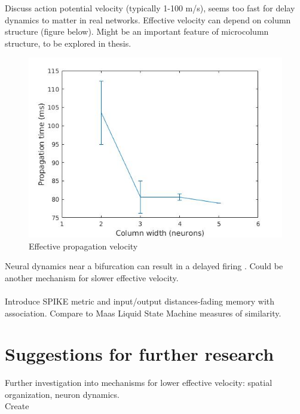 \documentclass[a4paper,11pt]{article}
\numberwithin{equation}{section}
\begin{document}
Discuss action potential velocity (typically 1-100 m/s), seems too fast for delay dynamics to matter in real networks.
Effective velocity can depend on column structure (figure below). 
Might be an important feature of microcolumn structure, to be explored in thesis.
\\
\begin{figure}
 \caption{Effective propagation velocity}
 \centering
   \includegraphics[width=\textwidth]{fig/propagation_time}
\end{figure}
Neural dynamics near a bifurcation can result in a delayed firing \cite{izhikevich}.
Could be another mechanism for slower effective velocity.
\\ \\
Introduce SPIKE metric and input/output distances-fading memory with association.
Compare to Maas Liquid State Machine measures of similarity.
\\
\section{Suggestions for further research}
Further investigation into mechanisms for lower effective velocity: spatial organization, neuron dynamics.\\
Create 

\printbibliography
\end{document}
